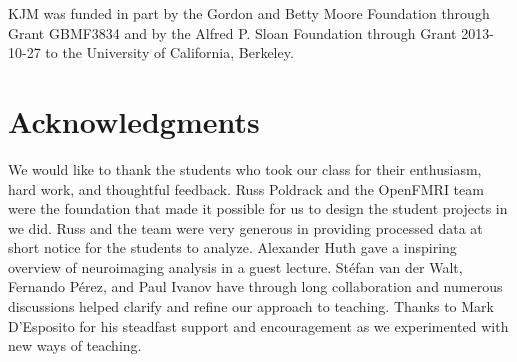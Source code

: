 \documentclass[utf8]{frontiersSCNS} %
\begin{document}
KJM was funded in part by the Gordon and Betty Moore Foundation through Grant
GBMF3834 and by the Alfred P. Sloan Foundation through Grant 2013-10-27 to the
University of California, Berkeley.

\section*{Acknowledgments}
We would like to thank the students who took our class for their enthusiasm,
hard work, and thoughtful feedback.  Russ Poldrack and the OpenFMRI team
were the foundation that made it possible for us to design the student
projects in we did. Russ and the team were very generous in providing
processed data at short notice for the students to analyze.  Alexander Huth
gave a inspiring overview of neuroimaging analysis in a guest lecture.
St{\'e}fan van der Walt, Fernando P{\'e}rez, and Paul Ivanov have through long
collaboration and numerous discussions helped clarify and refine our approach
to teaching.  Thanks to Mark D'Esposito for his steadfast support and
encouragement as we experimented with new ways of teaching.



\end{document}
